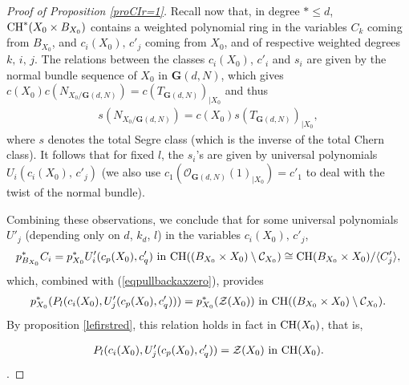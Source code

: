 \documentclass[10pt]{article}
\begin{document}
\begin{proof}[Proof of Proposition \ref{proCIr=1}]
Recall now  that,  in degree $*\leq d$,  ${\rm CH}^*(X_0\times B_{X_0})$
contains a weighted polynomial ring in the variables $C_k$ coming from $B_{X_0}$, and $c_i(X_0),\,c'_j$ coming from
$X_0$, and of respective weighted degrees $k,\,i,\,j$. The relations
between the classes  $c_i(X_0)$, $c'_i$ and  $s_i$  are given by the normal bundle sequence
of $X_0$ in $\mathbf{G}(d,N)$, which gives
$c(X_0)c(N_{X_0/\mathbf{G}(d,N)})=c(T_{\mathbf{G}(d,N)})_{\mid X_0}$
and thus
\begin{eqnarray}
\label{eqnormbun} s(N_{X_0/\mathbf{G}(d,N)})=c(X_0)s(T_{\mathbf{G}(d,N)})_{\mid X_0},
\end{eqnarray}
where $s$ denotes the total Segre class (which is the inverse of the total Chern class).
It follows that for fixed $l$, the $s_i$'s are given by universal polynomials
$U_i(c_i(X_0),\,c'_j)$ (we also use $c_1(\mathcal{O}_{\mathbf{G}(d,N)}(1)_{\mid X_0})=c'_1$ to deal with the twist of the  normal bundle).

 Combining these observations, we conclude
 that for some universal polynomials $U'_j$ (depending only on $d$, $k_d$, $l$) in the variables
$c_i(X_0),\,c'_j$,
\begin{eqnarray} \label{eqnouveaudecheznew}  p_{B_{X_0}}^*C_i=p_{X_0}^*U'_i(c_p(X_0),c'_q)\,\,{\rm in}\,\,{\rm CH}((B_{X_0}\times X_0)\setminus \mathcal{C}_{X_0})\cong {\rm CH}(B_{X_0}\times X_0)/\langle C'_j\rangle,
\end{eqnarray}
which, combined with
 (\ref{eqpullbackaxzero}), provides
\begin{eqnarray}\label{equnivformula}p_{X_0}^*(P_l(c_i(X_0),U'_j(c_p(X_0),c'_q)))
=p_{X_0}^*(\mathcal{Z}(X_0))\,\,{\rm in}\,\,{\rm CH}((B_{X_0}\times X_0)\setminus \mathcal{C}_{X_0}).
\end{eqnarray}
By proposition \ref{lefirstred}, this relation holds in fact in ${\rm CH}(X_0)$, that is,

\begin{eqnarray}\label{equnivformulaenbas}P_l(c_i(X_0),U'_j(c_p(X_0),c'_q))
=\mathcal{Z}(X_0)\,\,{\rm in}\,\,{\rm CH}( X_0).
\end{eqnarray}.


\end{proof}
\end{document}
